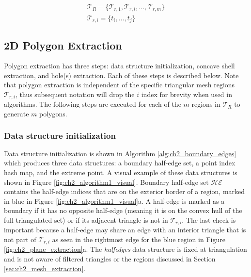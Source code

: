 \begin{align}
    \mathcal{T}_R = \{ \mathcal{T}_{r,1}, \mathcal{T}_{r,i},  \ldots, \mathcal{T}_{r,m} \} \\
    \mathcal{T}_{r,i} =  \{ t_{i}, \ldots, t_{j} \}
\end{align}


\subsection{2D Polygon Extraction}\label{sec:ch2_polygon_extraction}

Polygon extraction has three steps: data structure initialization, concave shell extraction, and hole(s) extraction. Each of these steps is described below. Note that polygon extraction is independent of the specific triangular mesh regions $\mathcal{T}_{r,i}$, thus subsequent notation will drop the $i$ index for brevity when used in algorithms. The following steps are executed for each of the $m$ regions in $\mathcal{T}_{R}$ to generate $m$ polygons.

\subsubsection{Data structure initialization}

Data structure initialization is shown in Algorithm \ref{alg:ch2_boundary_edges} which produces three data structures: a boundary half-edge set, a point index hash map, and the extreme point. A visual example of these data structures is shown in Figure \ref{fig:ch2_algorithm1_visual}. Boundary half-edge set $\mathcal{HE}$ contains the half-edge indices that are on the exterior border of a region, marked in blue in Figure \ref{fig:ch2_algorithm1_visual}a.  A half-edge is marked as a boundary if it has no opposite half-edge (meaning it is on the convex hull of the full triangulated set) or if its adjacent triangle is not in $\mathcal{T}_{r,i}$. The last check is important because a half-edge may share an edge with an interior triangle that is not part of $\mathcal{T}_{r,i}$ as seen in the rightmost edge for the blue region in Figure \ref{fig:ch2_plane_extraction}a. The \emph{halfedges} data structure is fixed at triangulation and is not aware of filtered triangles or the regions discussed in Section \ref{sec:ch2_mesh_extraction}.

